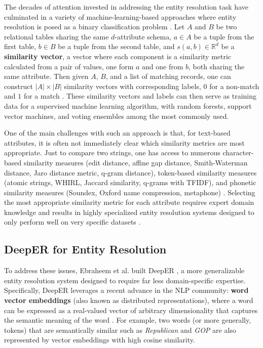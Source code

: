 \documentclass{proc}
\begin{document}
The decades of attention invested in addressing the entity resolution task have culminated in a variety of machine-learning-based approaches where entity resolution is posed as a binary classification problem \cite{elmagarmid-duplicate-record-detection, fellegi-theory, naumann-introduction, bilenko-adaptive}. Let $A$ and $B$ be two relational tables sharing the same $d$-attribute schema, $a \in A$ be a tuple from the first table, $b \in B$ be a tuple from the second table, and $s(a, b) \in \mathbb{R}^d$ be a \textbf{similarity vector}, a vector where each component is a similarity metric calculated from a pair of values, one form $a$ and one from $b$, both sharing the same attribute. Then given $A$, $B$, and a list of matching records, one can construct $|A| \times |B|$ similarity vectors with corresponding labels, $0$ for a non-match and $1$ for a match \cite{fellegi-theory}. These similarity vectors and labels can then serve as training data for a supervised machine learning algorithm, with random forests, support vector machines, and voting ensembles among the most commonly used.

One of the main challenges with such an approach is that, for text-based attributes, it is often not immediately clear which similarity metrics are most appropriate. Just to compare two strings, one has access to numerous character-based similarity measures (edit distance, affine gap distance, Smith-Waterman distance, Jaro distance metric, q-gram distance), token-based similarity measures (atomic strings, WHIRL, Jaccard similarity, q-grams with TFIDF), and phonetic similarity measures (Soundex, Oxford name compression, metaphone) \cite{elmagarmid-duplicate-record-detection}. Selecting the most appropriate similarity metric for each attribute requires expert domain knowledge and results in highly specialized entity resolution systems designed to only perform well on very specific datasets \cite{ebraheem-deep-er}.

\subsection{DeepER for Entity Resolution}

To address these issues, Ebraheem et al. built DeepER \cite{ebraheem-deep-er}, a more generalizable entity resolution system designed to require far less domain-specific expertise. Specifically, DeepER leverages a recent advance in the NLP community: \textbf{word vector embeddings} (also known as distributed representations), where a word can be expressed as a real-valued vector of arbitrary dimensionality that captures the semantic meaning of the word \cite{mikolov-distributed}. For example, two words (or more generally, tokens) that are semantically similar such as \textit{Republican} and \textit{GOP} are also represented by vector embeddings with high cosine similarity.
\end{document}
